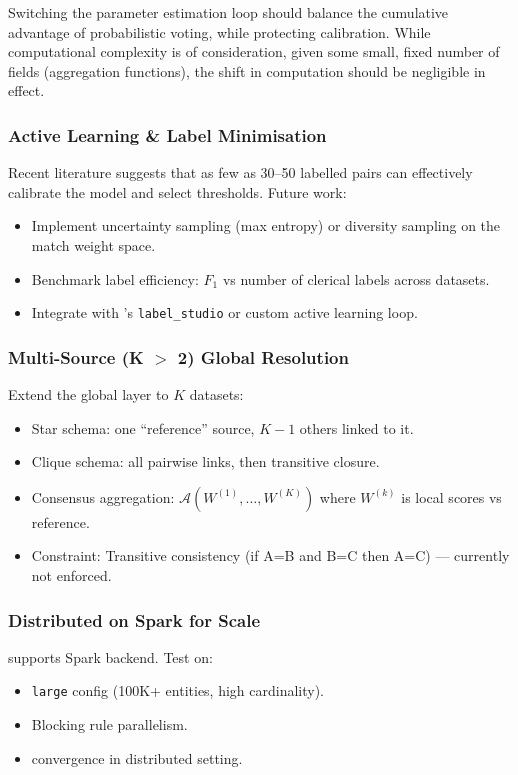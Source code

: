 Switching the parameter estimation loop should balance the cumulative advantage of probabilistic voting, while protecting calibration. While computational complexity is of consideration, given some small, fixed number of fields (aggregation functions), the shift in computation should be negligible in effect.

\subsubsection{Active Learning \& Label Minimisation}
\label{sec:future_active}
Recent literature \cite{mozafari2025active, rough2024minimal, binette2022almost} suggests that as few as 30--50 labelled pairs can effectively calibrate the \fellegisunter{} model and select thresholds.
Future work:
\begin{itemize}
	\item Implement uncertainty sampling (max entropy) or diversity sampling on the match weight space.
	\item Benchmark label efficiency: $F_1$ vs number of clerical labels across datasets.
	\item Integrate with \splink{}'s \texttt{label\_studio} or custom active learning loop.
\end{itemize}

\subsubsection{Multi-Source (K $>$ 2) Global Resolution}
\label{sec:future_multisource}
Extend the global layer to $K$ datasets:
\begin{itemize}
	\item Star schema: one ``reference'' source, $K-1$ others linked to it.
	\item Clique schema: all pairwise links, then transitive closure.
	\item Consensus aggregation: $\mathcal{A}(W^{(1)}, \dots, W^{(K)})$ where $W^{(k)}$ is local scores vs reference.
	\item Constraint: Transitive consistency (if A=B and B=C then A=C) — currently not enforced.
\end{itemize}

\subsubsection{Distributed \splink{} on Spark for Scale}
\label{sec:future_distributed}
\splink{} supports Spark backend. Test on:
\begin{itemize}
	\item \texttt{large} config (100K+ entities, high cardinality).
	\item Blocking rule parallelism.
	\item \emalgo{} convergence in distributed setting.
\end{itemize}

